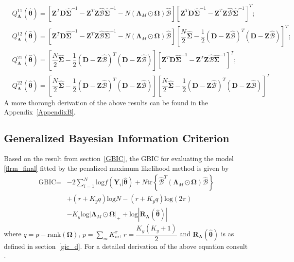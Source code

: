 \begin{align}
& Q^{11}_{\bm{\Lambda}}(\hat{\bm{\theta}}) = \left[\bm{Z}^T\bm{D}\hat{\bm{\Sigma}}^{-1} - \bm{Z}^T\bm{Z}\hat{\bm{\mathcal{B}}}\hat{\bm{\Sigma}}^{-1}-N \left(\bm{\Lambda}_M \odot \bm{\Omega} \right)\hat{\bm{\mathcal{B}}}\right]\left[\bm{Z}^T\bm{D}\hat{\bm{\Sigma}}^{-1} - \bm{Z}^T\bm{Z}\hat{\bm{\mathcal{B}}}\hat{\bm{\Sigma}}^{-1}\right]^T; \nonumber \\
& Q^{12}_{\bm{\Lambda}}(\hat{\bm{\theta}}) = \left[\bm{Z}^T\bm{D}\hat{\bm{\Sigma}}^{-1} - \bm{Z}^T\bm{Z}\hat{\bm{\mathcal{B}}}\hat{\bm{\Sigma}}^{-1}-N \left(\bm{\Lambda}_M \odot \bm{\Omega} \right)\hat{\bm{\mathcal{B}}}\right]\left[\dfrac{N}{2}\hat{\bm{\Sigma}}-\dfrac{1}{2}\left(\bm{D} - \bm{Z} \hat{\bm{\mathcal{B}}}\right)^T \left(\bm{D} - \bm{Z} \hat{\bm{\mathcal{B}}}\right) \right]^T; \nonumber \\
& Q^{21}_{\bm{\Lambda}}(\hat{\bm{\theta}}) = \left[\dfrac{N}{2}\hat{\bm{\Sigma}}-\dfrac{1}{2}\left(\bm{D} - \bm{Z} \hat{\bm{\mathcal{B}}}\right)^T \left(\bm{D} - \bm{Z} \hat{\bm{\mathcal{B}}}\right) \right]\left[\bm{Z}^T\bm{D}\hat{\bm{\Sigma}}^{-1} - \bm{Z}^T\bm{Z}\hat{\bm{\mathcal{B}}}\hat{\bm{\Sigma}}^{-1}\right]^T; \nonumber \\
& Q^{22}_{\bm{\Lambda}}(\hat{\bm{\theta}}) = \left[\dfrac{N}{2}\hat{\bm{\Sigma}}-\dfrac{1}{2}\left(\bm{D} - \bm{Z} \hat{\bm{\mathcal{B}}}\right)^T \left(\bm{D} - \bm{Z} \hat{\bm{\mathcal{B}}}\right) \right]\left[\dfrac{N}{2}\hat{\bm{\Sigma}}-\dfrac{1}{2}\left(\bm{D} - \bm{Z} \hat{\bm{\mathcal{B}}}\right)^T \left(\bm{D} - \bm{Z} \hat{\bm{\mathcal{B}}}\right) \right]^T\nonumber
\end{align}
A more thorough derivation of the above results can be found in the Appendix~\ref{AppendixB}.

\subsection{Generalized Bayesian Information Criterion}
Based on the result from section~\ref{GBIC}, the GBIC for evaluating the model \ref{flrm_final} fitted by the penalized maximum likelihood method is given by
\begin{align}
\text{GBIC} =& -2 \sum_{i=1}^{N} \text{log} f(\bm{Y}_i|\hat{\bm{\theta}}) + N \text{tr} \left\{\hat{\bm{\mathcal{B}}}^T \left(\bm{\Lambda}_M \odot \bm{\Omega} \right) \hat{\bm{\mathcal{B}}} \right\} \nonumber \\ 
& + (r + K_y q)\text{log}N - (r+K_y q)\text{log}(2\pi) \nonumber \\
& - K_y \text{log}|\bm{\Lambda}_M \odot \bm{\Omega}|_{+} + \text{log}|\bm{R}_{\bm{\Lambda}}(\hat{\bm{\theta}})|
\end{align}
where $q = p - \text{rank}(\bm{\Omega})$, $p = \sum_{m} K^{x}_{m}$, $r = \dfrac{K_y(K_y+1)}{2}$ and $\bm{R}_{\bm{\Lambda}}(\hat{\bm{\theta}})$ is as defined in section~\ref{gic_d}. For a detailed derivation of the above equation consult \cite{Matsui2009}.

